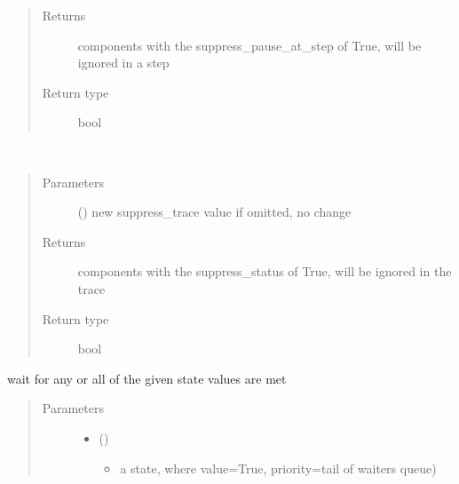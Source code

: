 \documentclass[letterpaper,10pt,english]{sphinxmanual}
\begin{document}
\begin{fulllineitems}
\begin{fulllineitems}
\begin{quote}
\begin{description}
\item[{Returns}] \leavevmode
{} \textendash{} components with the suppress\_pause\_at\_step of True, will be ignored in a step

\item[{Return type}] \leavevmode
bool

\end{description}\end{quote}

\end{fulllineitems}


\begin{fulllineitems}
\label{\detokenize{Reference:salabim.Component.suppress_trace}}~\begin{quote}\begin{description}
\item[{Parameters}] \leavevmode
{} () \textendash{} new suppress\_trace value 
if omitted, no change

\item[{Returns}] \leavevmode
{} \textendash{} components with the suppress\_status of True, will be ignored in the trace

\item[{Return type}] \leavevmode
bool

\end{description}\end{quote}

\end{fulllineitems}


\begin{fulllineitems}
\label{\detokenize{Reference:salabim.Component.wait}}
wait for any or all of the given state values are met
\begin{quote}\begin{description}
\item[{Parameters}] \leavevmode\begin{itemize}
\item {} 
 (\sphinxstyleliteralemphasis{, }) \textendash{} \begin{itemize}
\item {} 
a state, where value=True, priority=tail of waiters queue)


\end{itemize}
\end{itemize}
\end{description}
\end{quote}
\end{fulllineitems}
\end{fulllineitems}
\end{document}
